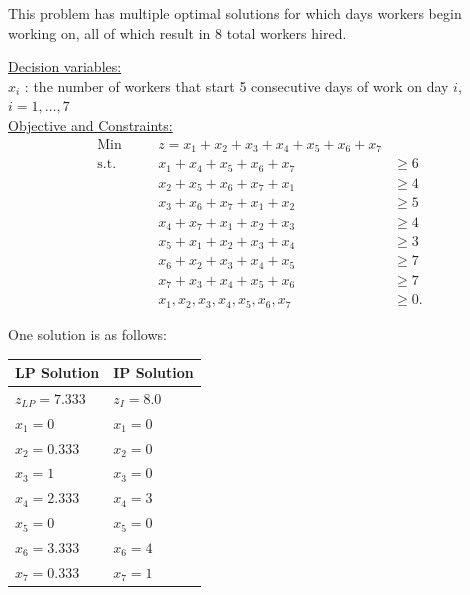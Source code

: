 \begin{solution} This problem has multiple optimal solutions for which days workers begin working on, all of which result in 8 total workers hired. 

\underline{Decision variables:} \\
$x_i$ : the number of workers that start 5 consecutive days of work on day $i$, $ i = 1,\dots,7$ \\
\smallskip \underline{Objective and Constraints:}
\begin{align*}
\mbox{Min~~ } && z = x_1 + x_2 + x_3 + x_4 + x_5 + x_6 + x_7  \\
\mbox{s.t.~~} && x_1 + x_4 + x_5 + x_6 + x_7 &\ge 6 \\
&& x_2 + x_5 + x_6 + x_7 + x_1 &\ge 4 \\
&& x_3 + x_6 + x_7 + x_1 + x_2 &\ge 5 \\
&& x_4 + x_7 + x_1 + x_2 + x_3 &\ge 4 \\
&& x_5 + x_1 + x_2 + x_3 + x_4 &\ge 3 \\
&& x_6 + x_2 + x_3 + x_4 + x_5 &\ge 7 \\
&& x_7 + x_3 + x_4 + x_5 + x_6 &\ge 7 \\
&& x_1, x_2, x_3, x_4, x_5, x_6, x_7 &\ge 0.
\end{align*}

One solution is as follows:
\begin{center} \begin{tabular} {|l|l|}
\hline   LP Solution        & IP Solution \\
\hline  $z_{LP} = 7.333$    & $z_I = 8.0$ \\
\hline  $x_1 = 0$           & $x_1 = 0$ \\
\hline  $x_2 = 0.333$       & $x_2 = 0 $ \\
\hline  $x_3 = 1$           & $x_3 = 0$ \\
\hline  $x_4 = 2.333$       & $x_4 = 3$ \\
\hline  $x_5 = 0$           & $x_5 = 0 $ \\
\hline  $x_6 = 3.333$       & $x_6 = 4 $ \\
\hline  $x_7 = 0.333$       & $x_7 = 1 $ \\
\hline
\end{tabular} \end{center} 
\end{solution}




